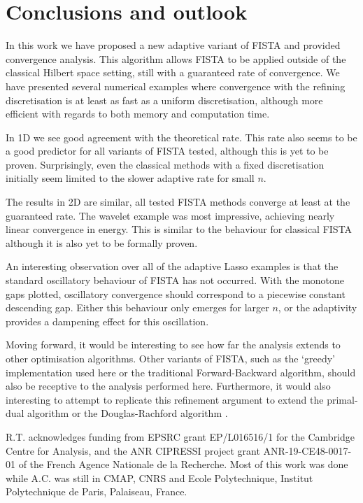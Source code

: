 \documentclass[smallextended]{svjour3}
\newcommand{\1}{\F{1}}
\begin{document}
	\section{Conclusions and outlook}
	In this work we have proposed a new adaptive variant of FISTA and provided convergence analysis. This algorithm allows FISTA to be applied outside of the classical Hilbert space setting, still with a guaranteed rate of convergence. We have presented several numerical examples where convergence with the refining discretisation is at least as fast as a uniform discretisation, although more efficient with regards to both memory and computation time. 
	
	In 1D we see good agreement with the theoretical rate. This rate also seems to be a good predictor for all variants of FISTA tested, although this is yet to be proven. Surprisingly, even the classical methods with a fixed discretisation initially seem limited to the slower adaptive rate for small $n$.
	
	The results in 2D are similar, all tested FISTA methods converge at least at the guaranteed rate. The wavelet example was most impressive, achieving nearly linear convergence in energy. This is similar to the behaviour for classical FISTA although it is also yet to be formally proven.
	
	An interesting observation over all of the adaptive Lasso examples is that the standard oscillatory behaviour of FISTA has not occurred. With the monotone gaps plotted, oscillatory convergence should correspond to a piecewise constant descending gap. Either this behaviour only emerges for larger $n$, or the adaptivity provides a dampening effect for this oscillation.
	
	Moving forward, it would be interesting to see how far the analysis extends to other optimisation algorithms. Other variants of FISTA, such as the `greedy' implementation used here or the traditional Forward-Backward algorithm, should also be receptive to the analysis performed here. Furthermore, it would also interesting to attempt to replicate this refinement argument to extend the primal-dual algorithm \cite{Chambolle2011} or the Douglas-Rachford algorithm \cite{Douglas1956}.
	
	\begin{acknowledgements}
		R.T. acknowledges funding from EPSRC grant EP/L016516/1 for the Cambridge Centre for Analysis, and the ANR CIPRESSI project grant ANR-19-CE48-0017-01 of the French Agence Nationale de la Recherche. Most of this work was done while A.C. was still in CMAP, CNRS and Ecole Polytechnique, Institut Polytechnique de Paris, Palaiseau, France.
	\end{acknowledgements}
	\begingroup
	
	\endgroup
	\appendix
\end{document}
